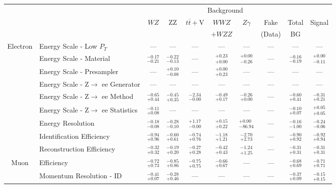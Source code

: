 
\renewcommand{\tabcolsep}{1pt}
\small\begin{tabular}{|cl||cccccc|c||c|}
\hline
 & & \multicolumn{7}{c||}{Background} & \\ 
 & & $WZ$ & ZZ & $t\overline{t}+$V & $WWZ$ & $Z\gamma$ & Fake & Total & Signal\\ 
 & & &  &  & $+WZZ$ &  & (Data) & BG & \\ 
\hline\hline
\multirow{9}{*}{Electron}
&Energy Scale - Low $P_{T}$ & --- & --- & --- & --- & --- & --- & --- & ---\\ 
\cline{2-10}
&Energy Scale - Material &  $^{-0.17}_{-0.21}$  &  $^{-0.22}_{-0.13}$  & --- &  $^{+0.23}_{+0.00}$  &  $^{+0.00}_{-0.26}$  & --- &  $^{-0.16}_{-0.19}$  &  $^{+0.00}_{-0.11}$ \\ 
\cline{2-10}
&Energy Scale - Presampler & --- &  $^{+0.10}_{-0.08}$  & --- &  $^{+0.00}_{+0.23}$  & --- & --- & --- & ---\\ 
\cline{2-10}
&Energy Scale - Z$\rightarrow$ ee Generator & --- & --- & --- & --- & --- & --- & --- & ---\\ 
\cline{2-10}
&Energy Scale - Z$\rightarrow$ ee Method &  $^{-0.65}_{+0.44}$  &  $^{-0.45}_{+0.35}$  &  $^{-2.34}_{-0.00}$  &  $^{-0.49}_{+0.17}$  &  $^{-0.26}_{+0.00}$  & --- &  $^{-0.60}_{+0.41}$  &  $^{-0.31}_{+0.21}$ \\ 
\cline{2-10}
&Energy Scale - Z$\rightarrow$ ee Statistics &  $^{-0.11}_{+0.08}$  & --- & --- & --- & --- & --- &  $^{-0.10}_{+0.07}$  &  $^{+0.05}_{+0.05}$ \\ 
\cline{2-10}
&Energy Resolution &  $^{-0.18}_{-0.08}$  &  $^{-0.28}_{-0.10}$  &  $^{+1.17}_{-0.00}$  &  $^{+0.15}_{+0.22}$  &  $^{+0.00}_{-86.94}$  & --- &  $^{-0.16}_{-1.00}$  &  $^{-0.24}_{-0.06}$ \\ 
\cline{2-10}
&Identification Efficiency &  $^{-0.94}_{+0.96}$  &  $^{-0.60}_{+0.61}$  &  $^{-0.74}_{+0.76}$  &  $^{-1.18}_{+1.21}$  &  $^{-2.70}_{+2.73}$  & --- &  $^{-0.90}_{+0.92}$  &  $^{-0.92}_{+0.94}$ \\ 
\cline{2-10}
&Reconstruction Efficiency &  $^{-0.32}_{+0.32}$  &  $^{-0.19}_{+0.20}$  &  $^{-0.27}_{+0.28}$  &  $^{-0.42}_{+0.43}$  &  $^{-1.24}_{+1.25}$  & --- &  $^{-0.31}_{+0.31}$  &  $^{-0.31}_{+0.31}$ \\ 
\hline
\multirow{4}{*}{Muon}
&Efficiency &  $^{-0.72}_{+0.73}$  &  $^{-0.85}_{+0.86}$  &  $^{-0.75}_{+0.75}$  &  $^{-0.66}_{+0.67}$  & --- & --- &  $^{-0.68}_{+0.69}$  &  $^{-0.71}_{+0.71}$ \\ 
\cline{2-10}
&Momentum Resolution - ID &  $^{-0.41}_{+0.07}$  &  $^{-0.28}_{+0.46}$  & --- & --- & --- & --- &  $^{-0.37}_{+0.09}$  &  $^{-0.15}_{+0.15}$ \\ 

\end{tabular}
